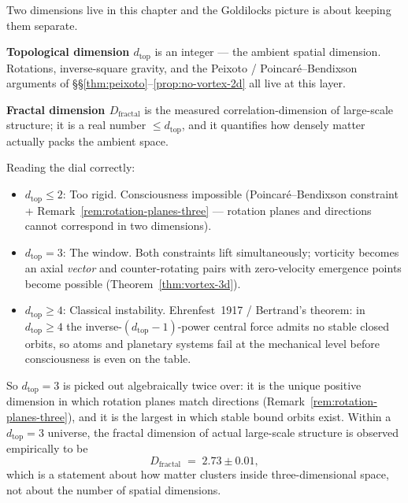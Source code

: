 \begin{intuitive}
Two dimensions live in this chapter and the Goldilocks picture is about keeping
them separate.

\textbf{Topological dimension $d_{\text{top}}$} is an integer --- the ambient
spatial dimension. Rotations, inverse-square gravity, and the Peixoto /
Poincar\'e--Bendixson arguments of \S\S\ref{thm:peixoto}--\ref{prop:no-vortex-2d}
all live at this layer.

\textbf{Fractal dimension $D_{\text{fractal}}$} is the measured
correlation-dimension of large-scale structure; it is a real number $\le d_{\text{top}}$,
and it quantifies how densely matter actually packs the ambient space.

Reading the dial correctly:
\begin{itemize}
\item $d_{\text{top}} \le 2$: Too rigid. Consciousness impossible
      (Poincar\'e--Bendixson constraint + Remark~\ref{rem:rotation-planes-three}
      --- rotation planes and directions cannot correspond in two dimensions).
\item $d_{\text{top}} = 3$: The window. Both constraints lift simultaneously;
      vorticity becomes an axial \emph{vector} and counter-rotating pairs with
      zero-velocity emergence points become possible
      (Theorem~\ref{thm:vortex-3d}).
\item $d_{\text{top}} \ge 4$: Classical instability.
      Ehrenfest~1917 / Bertrand's theorem: in $d_{\text{top}} \ge 4$ the
      inverse-$(d_{\text{top}}{-}1)$-power central force admits no stable closed
      orbits, so atoms and planetary systems fail at the mechanical level
      before consciousness is even on the table.
\end{itemize}

So $d_{\text{top}} = 3$ is picked out algebraically twice over: it is the unique
positive dimension in which rotation planes match directions
(Remark~\ref{rem:rotation-planes-three}), and it is the largest in which stable
bound orbits exist. Within a $d_{\text{top}} = 3$ universe, the fractal
dimension of actual large-scale structure is observed empirically to be
\begin{equation}
D_{\text{fractal}} \;=\; 2.73 \pm 0.01 ,
\end{equation}
which is a statement about how matter clusters inside three-dimensional space,
not about the number of spatial dimensions.
\end{intuitive}

